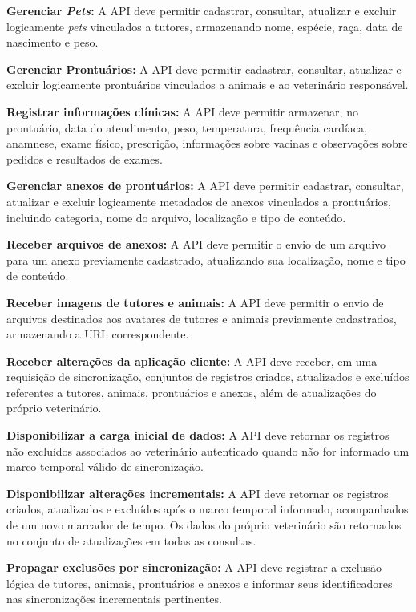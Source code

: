 \begin{description}[leftmargin=1.8cm, labelwidth=1.5cm, itemsep=0.5em]
    \item[RF09] \textbf{Gerenciar \textit{Pets}:} A API deve permitir cadastrar, consultar, atualizar e excluir logicamente \textit{pets} vinculados a tutores, armazenando nome, espécie, raça, data de nascimento e peso.
    \item[RF10] \textbf{Gerenciar Prontuários:} A API deve permitir cadastrar, consultar, atualizar e excluir logicamente prontuários vinculados a animais e ao veterinário responsável.
    \item[RF11] \textbf{Registrar informações clínicas:} A API deve permitir armazenar, no prontuário, data do atendimento, peso, temperatura, frequência cardíaca, anamnese, exame físico, prescrição, informações sobre vacinas e observações sobre pedidos e resultados de exames.
    \item[RF12] \textbf{Gerenciar anexos de prontuários:} A API deve permitir cadastrar, consultar, atualizar e excluir logicamente metadados de anexos vinculados a prontuários, incluindo categoria, nome do arquivo, localização e tipo de conteúdo.
    \item[RF13] \textbf{Receber arquivos de anexos:} A API deve permitir o envio de um arquivo para um anexo previamente cadastrado, atualizando sua localização, nome e tipo de conteúdo.
    \item[RF14] \textbf{Receber imagens de tutores e animais:} A API deve permitir o envio de arquivos destinados aos avatares de tutores e animais previamente cadastrados, armazenando a URL correspondente.
    \item[RF15] \textbf{Receber alterações da aplicação cliente:} A API deve receber, em uma requisição de sincronização, conjuntos de registros criados, atualizados e excluídos referentes a tutores, animais, prontuários e anexos, além de atualizações do próprio veterinário.
    \item[RF16] \textbf{Disponibilizar a carga inicial de dados:} A API deve retornar os registros não excluídos associados ao veterinário autenticado quando não for informado um marco temporal válido de sincronização.
    \item[RF17] \textbf{Disponibilizar alterações incrementais:} A API deve retornar os registros criados, atualizados e excluídos após o marco temporal informado, acompanhados de um novo marcador de tempo. Os dados do próprio veterinário são retornados no conjunto de atualizações em todas as consultas.
    \item[RF18] \textbf{Propagar exclusões por sincronização:} A API deve registrar a exclusão lógica de tutores, animais, prontuários e anexos e informar seus identificadores nas sincronizações incrementais pertinentes.

\end{description}
